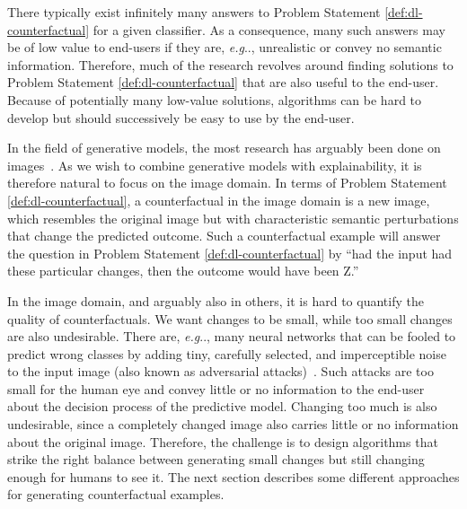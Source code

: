 \documentclass[11pt,a4paper,twoside,openright,final]{memoir}
\makeatletter
\DeclareRobustCommand\onedot{\futurelet\@let@token\@onedot}
\def\@onedot{\ifx\@let@token.\else.\null\fi\xspace}
\def\eg{\emph{e.g}\onedot} \def\Eg{\emph{E.g}\onedot}
\makeatother
\begin{document}
There typically exist infinitely many answers to Problem Statement \ref{def:dl-counterfactual} for a given classifier.
As a consequence, many such answers may be of low value to end-users if they are, \eg, unrealistic or convey no semantic information.
Therefore, much of the research revolves around finding solutions to Problem Statement \ref{def:dl-counterfactual} that are also useful to the end-user.
Because of potentially many low-value solutions, algorithms can be hard to develop but should successively be easy to use by the end-user.

In the field of generative models, the most research has arguably been done on images~\cite{realnvp, sngan, vae}.
As we wish to combine generative models with explainability, it is therefore natural to focus on the image domain.
In terms of Problem Statement \ref{def:dl-counterfactual}, a counterfactual in the image domain is a new image, which resembles the original image but with characteristic semantic perturbations that change the predicted outcome.
Such a counterfactual example will answer the question in Problem Statement \ref{def:dl-counterfactual} by ``had the input had these particular changes, then the outcome would have been Z.''

In the image domain, and arguably also in others, it is hard to quantify the quality of counterfactuals.
We want changes to be small, while too small changes are also undesirable. 
There are, \eg, many neural networks that can be fooled to predict wrong classes by adding tiny, carefully selected, and imperceptible noise to the input image (also known as adversarial attacks)~\cite{one-pixel-attack}. 
Such attacks are too small for the human eye and convey little or no information to the end-user about the decision process of the predictive model. 
Changing too much is also undesirable, since a completely changed image also carries little or no information about the original image.
Therefore, the challenge is to design algorithms that strike the right balance between generating small changes but still changing enough for humans to see it. 
The next section describes some different approaches for generating counterfactual examples.
\end{document}
